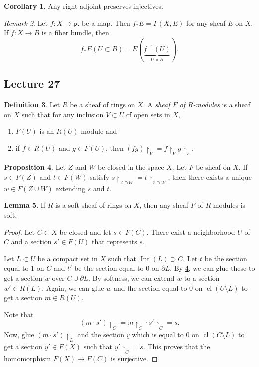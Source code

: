 \documentclass[10pt,letterpaper,cm]{nupset}
\theoremstyle{definition}
\newtheorem{definition}{Definition}[subsection]
\theoremstyle{theorem}
\newtheorem{lemma}[definition]{Lemma}
\newtheorem{prop}[definition]{Proposition}
\newtheorem{corollary}[definition]{Corollary}
\theoremstyle{remark}
\newtheorem{remark}[definition]{Remark}
\newcommand{\1}{\mathbb{1}}
\newcommand{\0}{\vec 0}
\newcommand{\pt}{\mathsf{pt}}
\DeclareMathOperator{\Int}{Int}
\DeclareMathOperator{\cl}{cl}
\begin{document}
\begin{corollary}
Any right adjoint preserves injectives. 
\end{corollary}

\smallskip

\begin{remark}
Let $f : X \to \pt$ be a map. Then $f_{\ast}{E} = \Gamma(X, E)$ for any sheaf $E$ on $X$. If $f : X \to B$ is a fiber bundle, then $$f_{\ast}{E}(U \subset B) = E(\underbrace{f^{-1}(U)}_{U \times B}).$$
\end{remark}

\subsection{Lecture 27}

\begin{definition}
Let $R$ be a sheaf of rings on $X$. A \textit{sheaf  $F$ of $R$-modules} is a sheaf on $X$ such that for any inclusion $V \subset U$ of open sets in $X$, 
\begin{enumerate}[label=(\roman*)]
\item $F(U)$ is an $R(U)$-module and
\item if $f \in R(U)$ and $g \in F(U)$, then $\left(fg\right)\restriction_V = f\restriction_V g\restriction_V$.
\end{enumerate}
\end{definition}


\begin{prop}\label{p2}
Let $Z$ and $W$ be closed in the space $X$. Let $F$ be sheaf on $X$. If $s\in F(Z)$ and $t \in F(W)$ satisfy $s \restriction_{Z \cap W} = t \restriction_{Z \cap W}$, then there exists a unique $w \in F(Z \cup W)$ extending $s$ and $t$.
\end{prop}

\begin{lemma}
If $R$ is a soft sheaf of rings on $X$, then any sheaf $F$ of $R$-modules is soft.
\end{lemma}
\begin{proof}
Let $C \subset X$ be closed and let $s \in F(C)$. There exist a neighborhood $U$ of $C$ and a section $s' \in F(U)$ that represents $s$. 

\medskip


Let $L\subset U$ be a compact set in $X$ such that $\Int(L) \supset C$. Let $t$ be the section equal to $1$ on $C$ and $t'$ be the section equal to $0$ on $\partial{L}$. By \cref{p2}, we can glue these to get a section $w$ over $C \cup \partial{L}$. By softness, we can extend $w$ to a section $w' \in R(L)$. Again, we can glue $w$ and the section equal to $0$ on $\cl(U \setminus L)$ to get a section $m\in R(U)$. 

\medskip

 Note that $$\left(m \cdot s'\right) \restriction_C = m \restriction_C \cdot s' \restriction_C = s .$$ Now, glue $\left(m \cdot s'\right) \restriction_L$ and the section $y$ which is equal to $0$ on $\cl(C \setminus L)$ to get a section $y'\in F(X)$ such that $y'\restriction_C = s$. This proves that the homomorphism $F(X) \to F(C)$ is surjective. 
\end{proof}
\end{document}
